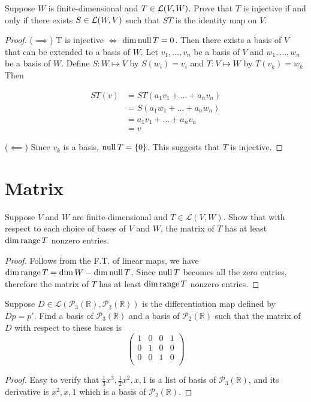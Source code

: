 \begin{exercise}
Suppose $W$ is finite-dimensional and \(T \in \mathcal{L}(V,W)\). Prove that $T$ is injective if and only if there exists \(S \in \mathcal{L} (W,V)\) such that $ST$ is the identity map on $V$.
\end{exercise}

\begin{proof}
	($\implies$) T is injective $\iff$ \(\dim \mathop{\mathrm{null}} T = 0\). Then there exists a basis of $V$ that can be extended to a basis of $W$. Let $v_1, \dots, v_n$ be a basis of $V$ and $w_1, \dots, w_n$ be a basis of $W$. Define $S: W \mapsto V$ by \(S(w_i) = v_i\) and \(T: V \mapsto W\) by \(T(v_k) = w_k\) Then

	\begin{align*}
		ST(v) & = ST(a_1 v_1 + \dots + a_n v_n) \\
		      & = S(a_1 w_1 + \dots + a_n w_n)  \\
		      & = a_1 v_1 + \dots + a_n v_n     \\
		      & = v
	\end{align*}

	($\impliedby$) Since $v_k$ is a basis, \(\mathop{\mathrm{null}} T = \{0\}\). This suggests that $T$ is injective.
\end{proof}

\section{Matrix}

\begin{exercise}
Suppose $V$ and $W$ are finite-dimensional and $T \in \mathcal{L}(V,W)$. Show that
with respect to each choice of bases of $V$ and $W$, the matrix of $T$ has at least $\operatorname{dim} \mathop{\mathrm{range}} T$ nonzero entries.
\end{exercise}

\begin{proof}
	Follows from the F.T. of linear maps, we have \(\dim \mathop{\mathrm{range}} T = \dim W - \dim \mathop{\mathrm{null}} T\).
	Since $\mathop{\mathrm{null}} T$ becomes all the zero entries, therefore
	the matrix of $T$ has at least $\dim \mathop{\mathrm{range}} T$ nonzero entries.
\end{proof}

\begin{exercise}
Suppose $D \in \mathcal{L}(\mathcal{P}_3(\mathbb{R}), \mathcal{P}_2(\mathbb{R}))$ is the differentiation map defined by $Dp = p\prime$. Find a basis of $\mathcal{P}_3(\mathbb{R})$
and a basis of $\mathcal{P}_2(\mathbb{R})$ such that the matrix of $D$ with respect to these bases is
\[
	\begin{pmatrix} 1 & 0 & 0 & 1 \\ 0 & 1 & 0 & 0 \\ 0 & 0 & 1 & 0 \\\end{pmatrix}\]
\end{exercise}
\begin{proof}
	Easy to verify that $\frac{1}{3}x^3, \frac{1}{2}x^2, x, 1$ is a list of basis
	of $\mathcal{P}_3(\mathbb{R})$, and its derivative is $x^2, x, 1$ which is a basis of $\mathcal{P}_2(\mathbb{R})$.
\end{proof}

